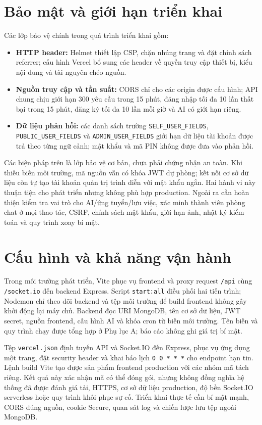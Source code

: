 \section{Bảo mật và giới hạn triển khai}

Các lớp bảo vệ chính trong quá trình triển khai gồm:

\begin{itemize}
    \item \textbf{HTTP header:} Helmet thiết lập CSP, chặn nhúng trang và đặt chính sách referrer; cấu hình Vercel bổ sung các header về quyền truy cập thiết bị, kiểu nội dung và tài nguyên chéo nguồn.
    \item \textbf{Nguồn truy cập và tần suất:} CORS chỉ cho các origin được cấu hình; API chung chịu giới hạn 300 yêu cầu trong 15 phút, đăng nhập tối đa 10 lần thất bại trong 15 phút, đăng ký tối đa 10 lần mỗi giờ và AI có giới hạn riêng.
    \item \textbf{Dữ liệu phản hồi:} các danh sách trường \texttt{SELF\_USER\_FIELDS}, \texttt{PUBLIC\_USER\_FIELDS} và \texttt{ADMIN\_USER\_FIELDS} giới hạn dữ liệu tài khoản được trả theo từng ngữ cảnh; mật khẩu và mã PIN không được đưa vào phản hồi.
\end{itemize}

Các biện pháp trên là lớp bảo vệ cơ bản, chưa phải chứng nhận an toàn. Khi thiếu biến môi trường, mã nguồn vẫn có khóa JWT dự phòng; kết nối cơ sở dữ liệu còn tự tạo tài khoản quản trị trình diễn với mật khẩu ngắn. Hai hành vi này thuận tiện cho phát triển nhưng không phù hợp production. Ngoài ra cần hoàn thiện kiểm tra vai trò cho AI/ứng tuyển/lưu việc, xác minh thành viên phòng chat ở mọi thao tác, CSRF, chính sách mật khẩu, giới hạn ảnh, nhật ký kiểm toán và quy trình xoay bí mật.

\section{Cấu hình và khả năng vận hành}

Trong môi trường phát triển, Vite phục vụ frontend và proxy request \texttt{/api} cùng \texttt{/socket.io} đến backend Express. Script \texttt{start:all} điều phối hai tiến trình; Nodemon chỉ theo dõi backend và tệp môi trường để build frontend không gây khởi động lại máy chủ. Backend đọc URI MongoDB, tên cơ sở dữ liệu, JWT secret, nguồn frontend, cấu hình AI và khóa cron từ biến môi trường. Tên biến và quy trình chạy được tổng hợp ở Phụ lục A; báo cáo không ghi giá trị bí mật.

Tệp \texttt{vercel.json} định tuyến API và Socket.IO đến Express, phục vụ ứng dụng một trang, đặt security header và khai báo lịch \texttt{0 0 * * *} cho endpoint hạn tin. Lệnh build Vite tạo được sản phẩm frontend production với các nhóm mã tách riêng. Kết quả này xác nhận mã có thể đóng gói, nhưng không đồng nghĩa hệ thống đã được đánh giá tải, HTTPS, cơ sở dữ liệu production, độ bền Socket.IO serverless hoặc quy trình khôi phục sự cố. Triển khai thực tế cần bí mật mạnh, CORS đúng nguồn, cookie Secure, quan sát log và chiến lược lưu tệp ngoài MongoDB.

